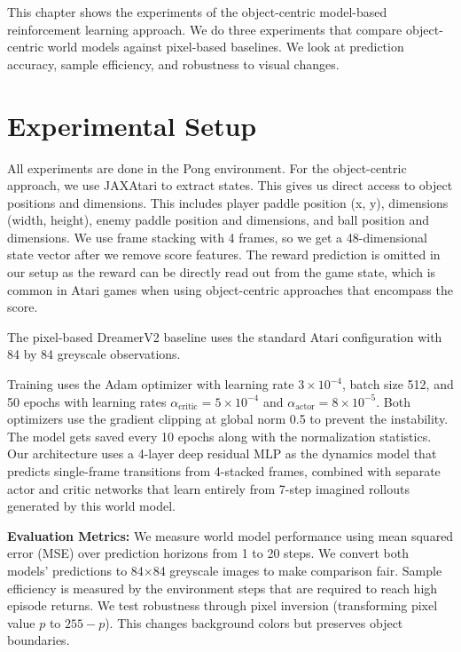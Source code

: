 \documentclass[
	english,
	ruledheaders=section,
	class=report,
	thesis={type=master},
	accentcolor=9c,
	custommargins=true,
	marginpar=false,
	parskip=half-,
	fontsize=11pt,
	pdfa=true,
]{tudapub}
\newcommand{\worldmodel}{world model}
\begin{document}
This chapter shows the experiments of the object-centric model-based
reinforcement learning approach. We do three experiments that compare
object-centric \worldmodel{}s against pixel-based baselines. We look at
prediction accuracy, sample efficiency, and robustness to visual changes.

\section{Experimental Setup}
\label{sec:exp_setup}

All experiments are done in the Pong environment. For the object-centric
approach, we use JAXAtari \cite{jaxatari} to extract states. This gives us direct access to
object positions and dimensions. This includes player paddle position (x, y),
dimensions (width, height), enemy paddle position and dimensions, and ball
position and dimensions. We use frame stacking with 4 frames, so we get a
48-dimensional state vector after we remove score features. The reward
prediction is omitted in our setup as the reward can be directly read out from
the game state, which is common in Atari games when using object-centric
approaches that encompass the score.

The pixel-based DreamerV2 baseline uses the standard Atari configuration with
84 by 84 greyscale observations.

Training uses the Adam optimizer with learning rate $3 \times 10^{-4}$, batch
size 512, and 50 epochs with learning rates $\alpha_{\text{critic}} = 5 \times 10^{-4}$ and
$\alpha_{\text{actor}} = 8 \times 10^{-5}$. Both optimizers use the gradient
clipping at global norm 0.5 to prevent the instability. The model gets saved every 10 epochs along with the
normalization statistics. Our architecture uses a 4-layer deep residual MLP as
the dynamics model that predicts single-frame transitions from 4-stacked frames,
combined with separate actor and critic networks that learn entirely from
7-step imagined rollouts generated by this \worldmodel{}.



\textbf{Evaluation Metrics:} We measure \worldmodel{} performance using mean
squared error (MSE) over prediction horizons from 1 to 20 steps. We convert both models'
predictions to 84×84 greyscale images to make comparison fair. Sample
efficiency is measured by the environment steps that are required to reach high episode
returns. We test robustness through pixel inversion (transforming pixel
value $p$ to $255 - p$). This changes background colors but preserves
object boundaries.
\end{document}
